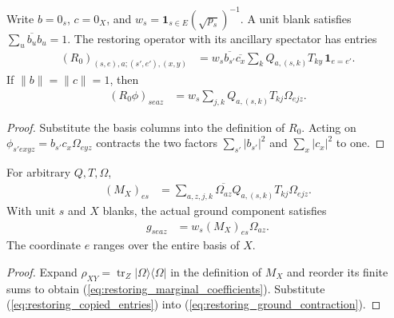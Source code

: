 \begin{theorem}
    \label{thm:restoring_blank_coordinates}
    \leanok
    Write $b=0_s$, $c=0_X$, and
    $w_s=\mathbf1_{s\in E}(\sqrt{p_s})^{-1}$.
    A unit blank satisfies $\sum_u\overline{b_u}b_u=1$.
    The restoring operator with its ancillary spectator has entries
    \begin{align}
        (R_0)_{(s,e),a;(s',e'),(x,y)}
          &=w_s\overline{b_{s'}}\overline{c_x}
            \sum_k Q_{a,(s,k)}T_{ky}\,\mathbf1_{e=e'}.
        \label{eq:restoring_ground_entries}
    \end{align}
    If $\|b\|=\|c\|=1$, then
    \begin{align}
        (R_0\phi)_{seaz}
          &=w_s\sum_{j,k}Q_{a,(s,k)}T_{kj}\Omega_{ejz}.
        \label{eq:restoring_copied_entries}
    \end{align}
\end{theorem}
\begin{proof}\leanok
    Substitute the basis columns into the definition of $R_0$.
    Acting on $\phi_{s'exyz}=b_{s'}c_x\Omega_{eyz}$ contracts the two
    factors $\sum_{s'}|b_{s'}|^2$ and $\sum_x|c_x|^2$ to one.
\end{proof}

\begin{theorem}
    \label{thm:restoring_ground_coefficients}
    \leanok
    For arbitrary $Q,T,\Omega$,
    \begin{align}
        (M_X)_{es}
          &=\sum_{a,z,j,k}\overline{\Omega_{az}}
              Q_{a,(s,k)}T_{kj}\Omega_{ejz}.
        \label{eq:restoring_marginal_coefficients}
    \end{align}
    With unit $s$ and $X$ blanks, the actual ground component satisfies
    \begin{align}
        g_{seaz}&=w_s(M_X)_{es}\Omega_{az}.
        \label{eq:restoring_ground_coefficients}
    \end{align}
    The coordinate $e$ ranges over the entire basis of $X$.
\end{theorem}
\begin{proof}\leanok
    Expand $\rho_{XY}=\operatorname{tr}_Z|\Omega\rangle\langle\Omega|$
    in the definition of $M_X$ and reorder its finite sums to obtain
    (\ref{eq:restoring_marginal_coefficients}). Substitute
    (\ref{eq:restoring_copied_entries}) into
    (\ref{eq:restoring_ground_contraction}).
\end{proof}

